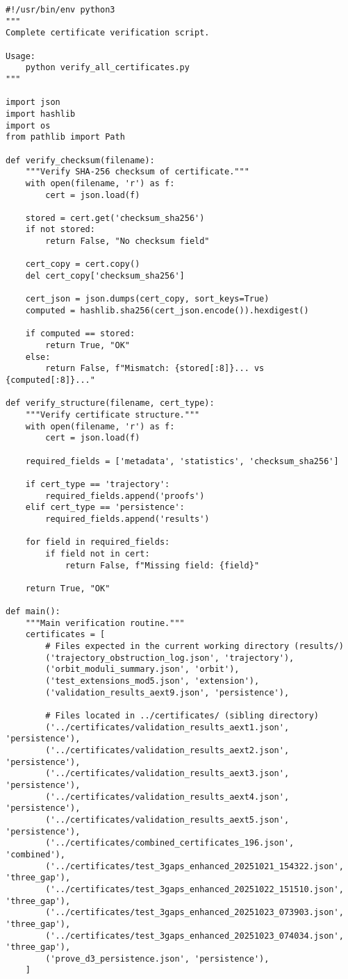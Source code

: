 \documentclass[11pt,a4paper]{article}
\theoremstyle{definition}
\begin{document}
\begin{lstlisting}[style=pythonstyle, caption={Complete Certificate Verification Script}]
#!/usr/bin/env python3
"""
Complete certificate verification script.

Usage:
    python verify_all_certificates.py
"""

import json
import hashlib
import os
from pathlib import Path

def verify_checksum(filename):
    """Verify SHA-256 checksum of certificate."""
    with open(filename, 'r') as f:
        cert = json.load(f)
    
    stored = cert.get('checksum_sha256')
    if not stored:
        return False, "No checksum field"
    
    cert_copy = cert.copy()
    del cert_copy['checksum_sha256']
    
    cert_json = json.dumps(cert_copy, sort_keys=True)
    computed = hashlib.sha256(cert_json.encode()).hexdigest()
    
    if computed == stored:
        return True, "OK"
    else:
        return False, f"Mismatch: {stored[:8]}... vs {computed[:8]}..."

def verify_structure(filename, cert_type):
    """Verify certificate structure."""
    with open(filename, 'r') as f:
        cert = json.load(f)
    
    required_fields = ['metadata', 'statistics', 'checksum_sha256']
    
    if cert_type == 'trajectory':
        required_fields.append('proofs')
    elif cert_type == 'persistence':
        required_fields.append('results')
    
    for field in required_fields:
        if field not in cert:
            return False, f"Missing field: {field}"
    
    return True, "OK"

def main():
    """Main verification routine."""
    certificates = [
        # Files expected in the current working directory (results/)
        ('trajectory_obstruction_log.json', 'trajectory'),
        ('orbit_moduli_summary.json', 'orbit'),
        ('test_extensions_mod5.json', 'extension'),
        ('validation_results_aext9.json', 'persistence'),

        # Files located in ../certificates/ (sibling directory)
        ('../certificates/validation_results_aext1.json', 'persistence'),
        ('../certificates/validation_results_aext2.json', 'persistence'),
        ('../certificates/validation_results_aext3.json', 'persistence'),
        ('../certificates/validation_results_aext4.json', 'persistence'),
        ('../certificates/validation_results_aext5.json', 'persistence'),
        ('../certificates/combined_certificates_196.json', 'combined'),
        ('../certificates/test_3gaps_enhanced_20251021_154322.json', 'three_gap'),
        ('../certificates/test_3gaps_enhanced_20251022_151510.json', 'three_gap'),
        ('../certificates/test_3gaps_enhanced_20251023_073903.json', 'three_gap'),
        ('../certificates/test_3gaps_enhanced_20251023_074034.json', 'three_gap'),
        ('prove_d3_persistence.json', 'persistence'),
    ]
    

\end{lstlisting}
\end{document}
